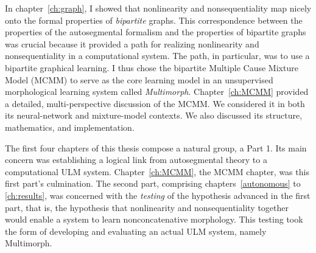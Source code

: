 In chapter~\ref{ch:graph}, I showed that nonlinearity 
and nonsequentiality map nicely onto the formal properties of \emph{bipartite} graphs.
This correspondence between the properties of the autosegmental formalism and the properties of bipartite graphs was crucial because it provided a path for realizing nonlinearity 
and nonsequentiality in a computational system. The path, in particular, was to use a bipartite graphical learning. I thus chose the bipartite Multiple Cause Mixture Model (MCMM) \citep{saund:94} to serve as the core learning model in an unsupervised morphological learning system called \emph{Multimorph}. Chapter~\ref{ch:MCMM} provided a detailed, multi-perspective discussion of the MCMM. We considered it  in both
its neural-network and mixture-model contexts. We also discussed its structure, mathematics, and implementation.

The first four chapters of this thesis compose a natural group, a Part 1. Its main concern was
 establishing a logical link from autosegmental theory to a computational ULM system. Chapter~\ref{ch:MCMM}, the MCMM chapter,
 was this first part's culmination. 
The second part, %
comprising chapters~\ref{autonomous} to \ref{ch:results}, was concerned with the \emph{testing} of the hypothesis advanced in the first part, that is, the hypothesis that nonlinearity and nonsequentiality together would enable a system to learn nonconcatenative morphology.
This testing took the form of developing and evaluating an actual ULM system, namely Multimorph. 

